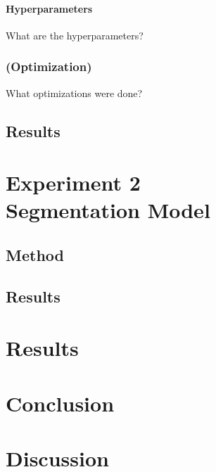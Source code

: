 \documentclass[a4paper, 12pt]{report}
\begin{document}
\subsubsection{Hyperparameters}
What are the hyperparameters?

\subsection{(Optimization)}
What optimizations were done?

\section{Results}

\chapter{Experiment 2 \\ Segmentation Model}
\section{Method}
\section{Results}

\chapter{Results}

\chapter{Conclusion}

\chapter{Discussion}



\end{document}
